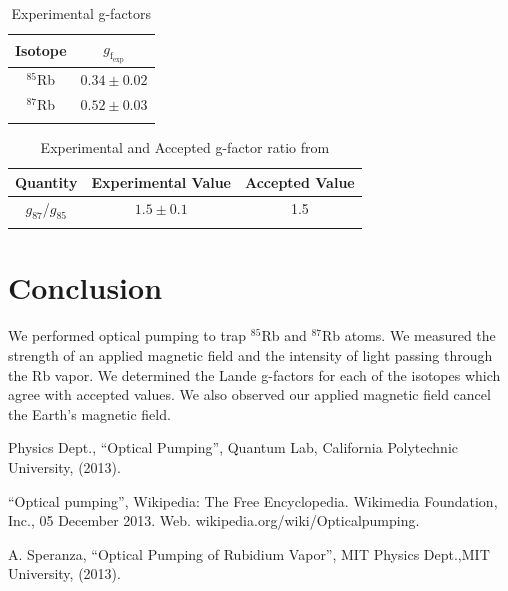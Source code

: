 \begin{table}[H]
\caption{Experimental g-factors }
\begin{tabular}{c@{\hskip 1cm} c}
\hline\noalign{\smallskip}
Isotope & $g_{\mathrm{f}_{\mathrm{exp}}}$ \\
\hline\noalign{\smallskip}
$^{85}$Rb & $0.34 \pm 0.02$\\
$^{87}$Rb & $0.52 \pm 0.03$\\
\hline\noalign{\smallskip}
\end{tabular}
\label{result}
\end{table}

\begin{table}[H]
\caption{Experimental and Accepted g-factor ratio from \cite{mit} }
\begin{tabular}{c@{\hskip 1cm} c@{\hskip 1cm} c}
\hline\noalign{\smallskip}
Quantity & Experimental Value & Accepted Value \\
\hline\noalign{\smallskip}
$g_{87}$/$g_{85}$ & $1.5 \pm 0.1$ & 1.5 \\
\hline\noalign{\smallskip}
\end{tabular}
\label{result2}
\end{table}

\section{Conclusion}
We performed optical pumping to trap $^{85}$Rb and  $^{87}$Rb atoms. We measured the strength of an applied magnetic field and the intensity of light passing through the Rb vapor. We determined the Lande g-factors for each of the isotopes which agree with accepted values. We also observed our applied magnetic field cancel the Earth's magnetic field.



\begin{thebibliography}{99}

 Physics Dept., ``Optical Pumping'', Quantum Lab,
  California Polytechnic University, (2013).

 ``Optical pumping'', Wikipedia: The Free Encyclopedia. Wikimedia Foundation, Inc., 05 December 2013. Web. wikipedia.org/wiki/Opticalpumping.


 A. Speranza, ``Optical Pumping of Rubidium Vapor'', MIT Physics Dept.,MIT University, (2013).


\end{thebibliography}


